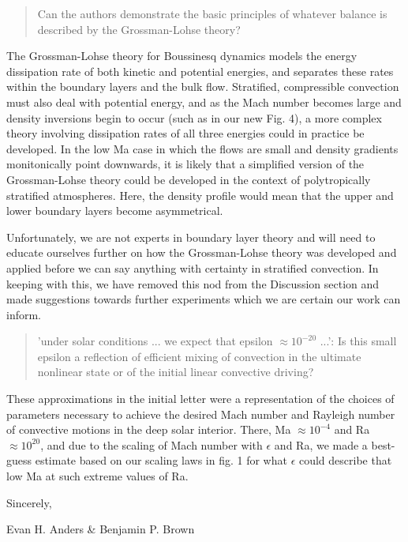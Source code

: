 \documentclass[aps, 11pt, singlecolumn]{revtex4-1} %
\begin{document}
\begin{singlespace}
\begin{quotation}
Can the authors demonstrate the basic principles of whatever balance
is described by the Grossman-Lohse theory?
\end{quotation}
The Grossman-Lohse theory for Boussinesq dynamics models the energy dissipation rate of both
kinetic and potential energies, and separates these rates within the boundary layers and
the bulk flow.  Stratified, compressible convection must also deal with potential energy,
and as the Mach number becomes large and density inversions begin to occur (such as in our new
Fig. 4), a more complex theory involving dissipation rates of all three energies could
in practice be developed.  In the low Ma case in which the flows are small and density 
gradients monitonically point downwards, it is likely that a simplified version of the
Grossman-Lohse theory could be developed in the context of polytropically stratified atmospheres.
Here, the density profile would mean that the upper and lower boundary layers become
asymmetrical.

Unfortunately, we are not experts in boundary layer theory and will need to educate ourselves
further on how the Grossman-Lohse theory was developed and applied before we can say anything
with certainty in stratified convection. In keeping with this, we have removed this nod from
the Discussion section and made suggestions towards further experiments which we are certain our
work can inform.


\begin{quotation}
'under solar conditions ... we expect that epsilon  $\approx 10^{-20}$
...': Is this small epsilon a reflection of efficient mixing of
convection in the ultimate nonlinear state or of the initial linear
convective driving?
\end{quotation}
These approximations in the initial letter were a representation of the choices of
parameters necessary to achieve the desired Mach number and Rayleigh number of convective
motions in the deep solar interior.  There, Ma $\approx 10^{-4}$ and Ra $\approx 10^{20}$,
and due to the scaling of Mach number with $\epsilon$ and Ra, we made a best-guess estimate
based on our scaling laws in fig. 1 for what $\epsilon$ could describe that low Ma at such
extreme values of Ra.

\end{singlespace}


\noindent
Sincerely,

Evan H. Anders \& Benjamin P. Brown




\end{document}
